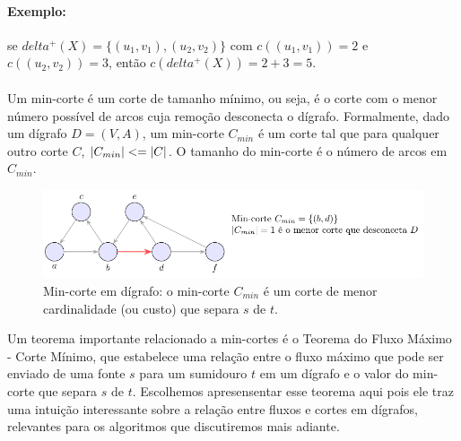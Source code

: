 \documentclass[12pt,a4paper]{article}
\def\leq{\string<=}%
\def\delta{delta}%
\begin{document}
\paragraph{Exemplo:} se \(\delta^+(X)=\{(u_1,v_1),(u_2,v_2)\}\) com \(c((u_1,v_1))=2\) e \(c((u_2,v_2))=3\), então \(c(\delta^+(X))=2+3=5\).

\paragraph{}
Um min-corte é um corte de tamanho mínimo, ou seja, é o corte com o menor número possível de arcos cuja remoção desconecta o dígrafo. Formalmente, dado um dígrafo \(D = (V, A)\), um min-corte \(C_{min}\) é um corte tal que para qualquer outro corte \(C\), \(|C_{min}| \leq |C|\). O tamanho do min-corte é o número de arcos em \(C_{min}\).


\begin{figure}[H]
    \centering
    \includegraphics[width=0.9\linewidth]{figures/fig_min_corte.pdf}

    \caption{Min-corte em dígrafo: o min-corte $C_{min}$ é um corte de menor cardinalidade (ou custo) que separa $s$ de $t$.}
    \label{fig:min-corte}
\end{figure}


Um teorema importante relacionado a min-cortes é o Teorema do Fluxo Máximo - Corte Mínimo, que estabelece uma relação entre o fluxo máximo que pode ser enviado de uma fonte \(s\) para um sumidouro \(t\) em um dígrafo e o valor do min-corte que separa \(s\) de \(t\). Escolhemos apresensentar esse teorema aqui pois ele traz uma intuição interessante sobre a relação entre fluxos e cortes em dígrafos, relevantes para os algoritmos que discutiremos mais adiante.
\end{document}
